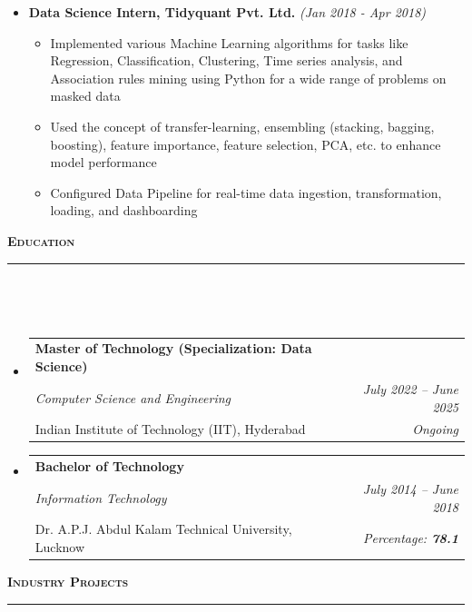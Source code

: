 \documentclass[a4paper,10pt]{article}
\makeatletter
\newcommand{\isep}{-2 pt}
\newcommand{\lsep}{-0.5cm}
\newcommand{\resheading}[1]{{\small
        {
            \begin{minipage}
                {0.992\textwidth}\textbf{{\textsc{#1 \vphantom{p\^{E}} }}}
                \\[-0.3cm]
                \hrule
            \end{minipage}
            \\[-0.5cm]
        }
 }}
\newcommand{\resEduHeading}[6]{
  \begin{tabular*}{7.1in}{l @{\extracolsep{\fill}} r}
    \textbf{\normalsize #1} \\
    \textit{#2} & \textit{#3} \\
    {\normalsize #4} & \textit{{#5} \textbf{#6}}
  \end{tabular*}
}
\makeatother
\begin{document}
\begin{itemize}
    \item \textbf{Data Science Intern, Tidyquant Pvt. Ltd.} \hfill {\emph{(Jan 2018 - Apr 2018)}}
    \\ [-0.6cm]
    \begin{itemize}\itemsep \isep
        \item Implemented various Machine Learning algorithms for tasks like Regression, Classification, Clustering, Time series analysis, and Association rules mining using Python for a wide range of problems on masked data 
        \item Used the concept of transfer-learning, ensembling (stacking, bagging, boosting), feature importance, feature selection, PCA, etc. to enhance model performance 
        \item Configured Data Pipeline for real-time data ingestion, transformation, loading, and dashboarding
    \\ [-0.5cm]
    \end{itemize}
\end{itemize}
\vspace{4pt}
\noindent
\resheading{\textbf{\large Education}}\\[\lsep]
\vspace{8pt}
\begin{itemize}
    \item \resEduHeading{Master of Technology (Specialization: Data Science)}
    {Computer Science and Engineering}
    {July 2022 -- June 2025}
    {Indian Institute of Technology (IIT), Hyderabad}
    {Ongoing}
    {}
    \item \resEduHeading{Bachelor of Technology}
    {Information Technology}
    {July 2014 -- June 2018}
    {Dr. A.P.J. Abdul Kalam Technical University, Lucknow}
    {Percentage:}
    {78.1}
\end{itemize}
\vspace{4pt}
\noindent
\resheading{\textbf{\large Industry Projects}}\\[\lsep] 
\end{document}
